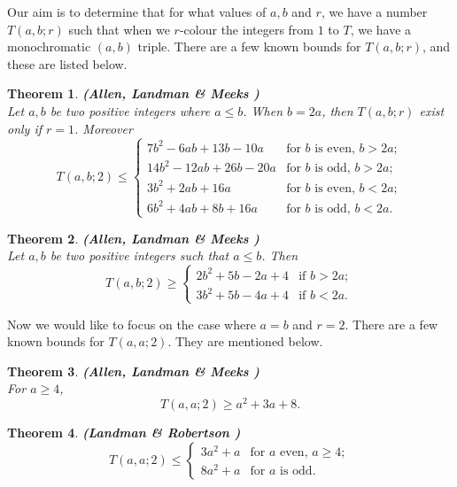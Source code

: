 \documentclass[12pt]{report}
\newtheorem{thm}{Theorem}[chapter]
\begin{document}
\noindent Our aim is to determine that for what values of $a,b$ and $r$, we have a number $T(a,b;r)$ such that when we $r$-colour the integers from $1$ to $T$, we have a monochromatic $(a,b)$ triple. There are a few known bounds for $T(a,b;r)$, and these are listed below.

\begin{thm}{\bf (Allen, Landman \& Meeks {\cite{ALM})}} \\[5pt]
Let $a,b$ be two positive integers where $a\le b$. When $b=2a$, then $T(a,b;r)$ exist only if $r=1$. Moreover 
\[ T(a,b;2) \le \left \{ \begin{array}{ll}
                                       7b^2-6ab+13b-10a & \mbox{for $b$ is even, $b>2a$}; \\
                                       14b^2-12ab+26b-20a & \mbox{for $b$ is odd, $b>2a$};\\
                                       3b^2+2ab+16a & \mbox{for $b$ is even, $b<2a$};\\
                                       6b^2+4ab+8b+16a & \mbox{for $b$ is odd, $b<2a$}.
                                     \end{array}
                        \right. 
\]
\end{thm}

\begin{thm}{\bf (Allen, Landman \& Meeks {\cite{ALM})}} \\[5pt]
Let $a,b$ be two positive integers such that $ a\leq b$. Then
\[ T(a,b;2) \geq \left\{ \begin{array}{ll}
                                        2b^2+5b-2a+4 & \mbox{if $b>2a$};\\
                                        3b^2+5b-4a+4 & \mbox{if $b<2a$}.
                                       \end{array}
                           \right. 
\]
\end{thm}

\noindent Now we would like to focus on the case where $a=b$ and $r=2$. There are a few known bounds for $T(a,a;2)$. They are mentioned below.

\begin{thm}{\bf (Allen, Landman \& Meeks {\cite{ALM})}} \\[5pt] 
For $a \ge 4$,  
\[ T(a,a;2) \ge a^2+3a+8. \]
\end{thm}

\begin{thm}{\bf (Landman \& Robertson \cite{LR02})} \\[5pt]
\[ T(a,a;2) \leq \left\{ \begin{array}{ll}
                                        3a^2+a & \mbox{for $a$ even, $a \ge 4$}; \\
                                        8a^2+a & \mbox{for $a$ is odd}.
                                       \end{array}
                           \right. 
\]
\end{thm}
\end{document}

